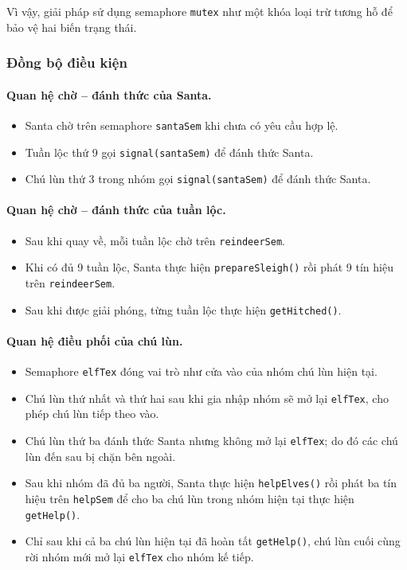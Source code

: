 Vì vậy, giải pháp sử dụng semaphore \texttt{mutex} như một khóa loại
trừ tương hỗ để bảo vệ hai biến trạng thái.

\subsubsection*{Đồng bộ điều kiện}

\paragraph{Quan hệ chờ -- đánh thức của Santa.}

\begin{itemize}
\item Santa chờ trên semaphore \texttt{santaSem} khi chưa có yêu cầu
hợp lệ.
\item Tuần lộc thứ 9 gọi \texttt{signal(santaSem)} để đánh thức Santa.
\item Chú lùn thứ 3 trong nhóm gọi \texttt{signal(santaSem)} để đánh
thức Santa.
\end{itemize}

\paragraph{Quan hệ chờ -- đánh thức của tuần lộc.}

\begin{itemize}
\item Sau khi quay về, mỗi tuần lộc chờ trên
\texttt{reindeerSem}.
\item Khi có đủ 9 tuần lộc, Santa thực hiện
\texttt{prepareSleigh()} rồi phát 9 tín hiệu trên
\texttt{reindeerSem}.
\item Sau khi được giải phóng, từng tuần lộc thực hiện
\texttt{getHitched()}.
\end{itemize}

\paragraph{Quan hệ điều phối của chú lùn.}

\begin{itemize}
\item Semaphore \texttt{elfTex} đóng vai trò như cửa vào của nhóm
chú lùn hiện tại.
\item Chú lùn thứ nhất và thứ hai sau khi gia nhập nhóm sẽ mở lại
\texttt{elfTex}, cho phép chú lùn tiếp theo vào.
\item Chú lùn thứ ba đánh thức Santa nhưng không mở lại
\texttt{elfTex}; do đó các chú lùn đến sau bị chặn bên ngoài.
\item Sau khi nhóm đã đủ ba người, Santa thực hiện
\texttt{helpElves()} rồi phát ba tín hiệu trên \texttt{helpSem} để cho
ba chú lùn trong nhóm hiện tại thực hiện \texttt{getHelp()}.
\item Chỉ sau khi cả ba chú lùn hiện tại đã hoàn tất
\texttt{getHelp()}, chú lùn cuối cùng rời nhóm mới mở lại
\texttt{elfTex} cho nhóm kế tiếp.
\end{itemize}

